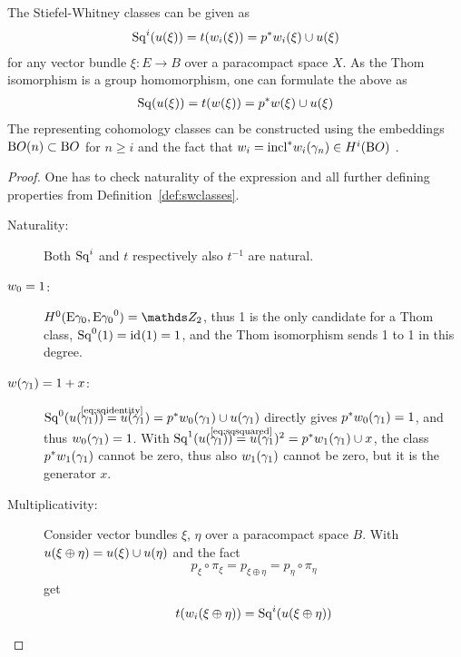 \begin{Thm}\label{thm:altdefswclasses}
  The Stiefel-Whitney classes can be given as
  \begin{gather*}
    \mathrm{Sq}^{i}({u}(\xi)) = t({w_{i}}(\xi)) = {p}^* {w_{i}}(\xi) \cup {u}(\xi)
  \end{gather*}
  for any vector bundle $\xi\colon E\to B$ over a paracompact space
  $X$. As the Thom isomorphism is a group homomorphism, one can
  formulate the above as
  \begin{gather*}
    \mathrm{Sq}({u}(\xi)) = t({w}(\xi)) = {p}^* {w}(\xi) \cup {u}(\xi)
  \end{gather*}
  The representing cohomology classes can be constructed using the
  embeddings $\mathrm{B}O(n)\subset\mathrm{B}O$ for $n\geq i$ and the fact that
  $w_{i}={\mathrm{incl}}^*{w_{i}}(\gamma_n)\in H^i(\mathrm{B}O)$
  \cite[see \forexample][Theorem~7.1~ff.]{milnor}.
  \begin{proof}
    One has to check naturality of the expression and all further
    defining properties from Definition~\ref{def:swclasses}.
    \begin{description}
    \item[Naturality:] Both $\mathrm{Sq}^{i}$ and $t$ respectively also $t^{-1}$
      are natural.
    \item[$w_{0}=1$:]
      $\H^0(\thomspacepair{\E{\gamma_0}}) = \Zmod2$, thus 1 is the only
      candidate for a Thom class, $\mathrm{Sq}^{0}(1) = \mathrm{id}_{}(1) = 1$, and the Thom
      isomorphism sends 1 to 1 in this degree.
    \item[${w}(\gamma_1)=1+x$:]
      $\Sq 0(\u{\gamma_1})\cequalsby{\eqref{eq:sqidentity}}\u{\gamma_1}
      = \pb p\w{0}{\gamma_1}\cup\u{\gamma_1}$
      directly gives
      ${p}^*{w_{0}}(\gamma_1)=1$, and thus ${w_{0}}(\gamma_1)=1$.
      With
      $\Sq 1(\u{\gamma_1})\cequalsby{\eqref{eq:sqsquared}}\u{\gamma_1}^2
      =\pb p\w{1}{\gamma_1}\cup x$,
      the class ${p}^*{w_{1}}(\gamma_1)$ cannot be zero, thus also
      ${w_{1}}(\gamma_1)$ cannot be zero, but it is the generator $x$.
    \item[Multiplicativity:]
      Consider vector bundles $\xi$, $\eta$ over a paracompact space
      $B$. With ${u}(\xi\oplus\eta)={u}(\xi)\cup{u}(\eta)$ and the fact
      \begin{gather}\label{eq:projectionscommute}
        p_\xi\circ\pi_\xi = p_{\xi\oplus\eta} = p_\eta\circ\pi_\eta
      \end{gather}
      get
      \begin{align*}
        \thomiso(\w{i}{\xi\oplus\eta})
        &= \Sq i(\u{\xi\oplus\eta}) \\

\end{align*}
\end{description}
\end{proof}
\end{Thm}
